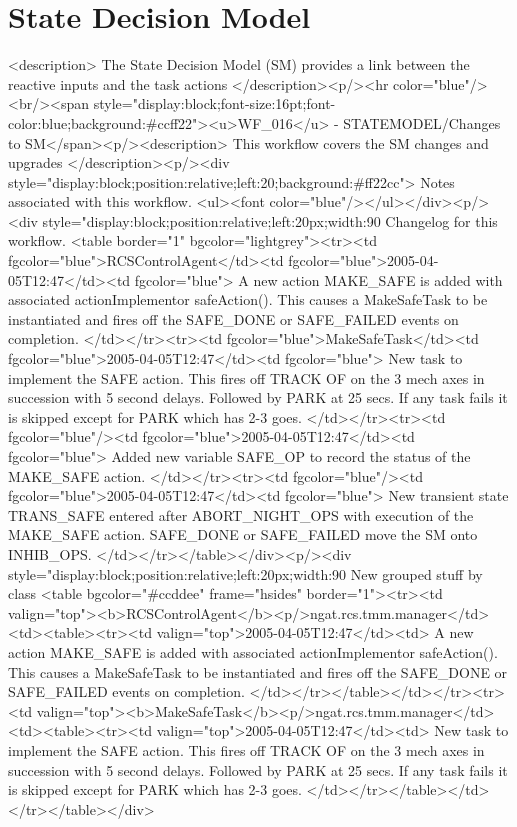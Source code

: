     \section{State Decision Model}

    <description>
      The State Decision Model (SM) provides a link between the reactive inputs and the task actions
    </description><p/><hr color="blue"/><br/><span style="display:block;font-size:16pt;font-color:blue;background:#ccff22"><u>WF_016</u> -    STATEMODEL/Changes to SM</span><p/><description>
	This workflow covers the SM changes and upgrades
      </description><p/><div style="display:block;position:relative;left:20;background:#ff22cc">
      Notes associated with this workflow.
      <ul><font color="blue"/></ul></div><p/><div style="display:block;position:relative;left:20px;width:90%
      Changelog for this workflow.
      <table border="1" bgcolor="lightgrey"><tr><td fgcolor="blue">RCSControlAgent</td><td fgcolor="blue">2005-04-05T12:47</td><td fgcolor="blue">
	    A new action MAKE_SAFE is added with associated actionImplementor safeAction().
	    This causes a MakeSafeTask to be instantiated and fires off the SAFE_DONE or SAFE_FAILED
	    events on completion.
	  </td></tr><tr><td fgcolor="blue">MakeSafeTask</td><td fgcolor="blue">2005-04-05T12:47</td><td fgcolor="blue">
	    New task to implement the SAFE action. This fires off TRACK OF on the 3 mech axes in succession
	    with 5 second delays. Followed by PARK at 25 secs. If any task fails it is skipped except for PARK
	    which has 2-3 goes.
	  </td></tr><tr><td fgcolor="blue"/><td fgcolor="blue">2005-04-05T12:47</td><td fgcolor="blue">
	    Added new variable SAFE_OP to record the status of the MAKE_SAFE action.	    
	</td></tr><tr><td fgcolor="blue"/><td fgcolor="blue">2005-04-05T12:47</td><td fgcolor="blue">
	    New transient state TRANS_SAFE entered after ABORT_NIGHT_OPS with execution of the MAKE_SAFE
	    action. SAFE_DONE or SAFE_FAILED move the SM onto INHIB_OPS. 
	</td></tr></table></div><p/><div style="display:block;position:relative;left:20px;width:90%
     New grouped stuff by class
     <table bgcolor="#ccddee" frame="hsides" border="1"><tr><td valign="top"><b>RCSControlAgent</b><p/>ngat.rcs.tmm.manager</td><td><table><tr><td valign="top">2005-04-05T12:47</td><td>
	    A new action MAKE_SAFE is added with associated actionImplementor safeAction().
	    This causes a MakeSafeTask to be instantiated and fires off the SAFE_DONE or SAFE_FAILED
	    events on completion.
	  </td></tr></table></td></tr><tr><td valign="top"><b>MakeSafeTask</b><p/>ngat.rcs.tmm.manager</td><td><table><tr><td valign="top">2005-04-05T12:47</td><td>
	    New task to implement the SAFE action. This fires off TRACK OF on the 3 mech axes in succession
	    with 5 second delays. Followed by PARK at 25 secs. If any task fails it is skipped except for PARK
	    which has 2-3 goes.
	  </td></tr></table></td></tr></table></div>

